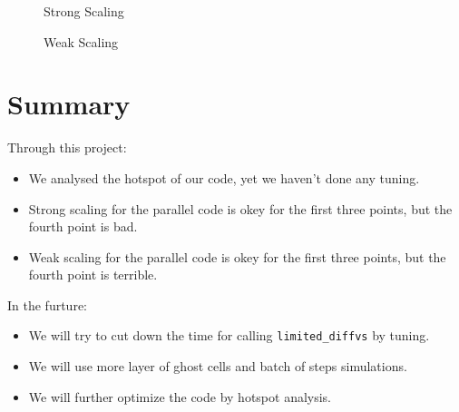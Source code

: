 \documentclass[11pt]{article}
\begin{document}
        \begin{center}
        \end{center}
        \begin{figure}[H]
            \centering
            \caption{Strong Scaling}
        \end{figure}

        \begin{center}
        \end{center}
        \begin{figure}[H]
            \centering
            \caption{Weak Scaling}
        \end{figure}

    \section{Summary}
        
    Through this project:
    \begin{itemize}
        \item We analysed the hotspot of our code, yet we haven't done any tuning.
        \item Strong scaling for the parallel code is okey for the first three points, but the fourth point is bad.
        \item Weak scaling for the parallel code is okey for the first three points, but the fourth point is terrible.
    \end{itemize}

    In the furture:
    \begin{itemize}
    	\item We will try to cut down the time for calling \texttt{limited\_diffvs} by tuning.
    	\item We will use more layer of ghost cells and batch of steps simulations.
    	\item We will further optimize the code by hotspot analysis.
    \end{itemize}
\end{document}

